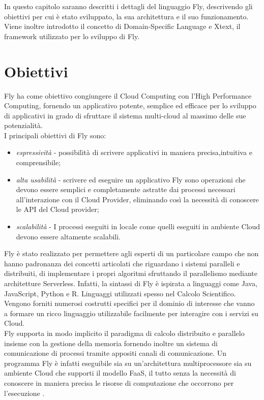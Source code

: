 In questo capitolo saranno descritti i dettagli del linguaggio Fly, descrivendo gli obiettivi per cui è stato sviluppato, la sua architettura e il suo funzionamento. Viene inoltre introdotto il concetto di Domain-Specific Language e Xtext, il framework utilizzato per lo sviluppo di Fly.

\section{Obiettivi}
Fly ha come obiettivo congiungere il Cloud Computing con l’High Performance Computing, fornendo un applicativo potente, semplice ed efficace per lo sviluppo di applicativi in grado di sfruttare il sistema multi-cloud al massimo delle sue potenzialità. \\
I principali obiettivi di Fly sono:

\begin{itemize}
    \item \textit{espressività} - possibilità di scrivere applicativi in maniera precisa,intuitiva e comprensibile;
    
    \item \textit{alta usabilità} - scrivere ed eseguire un applicativo Fly sono operazioni che devono essere semplici e completamente 
    astratte dai processi necessari all'interazione con il Cloud Provider, eliminando così la necessità di conoscere le API del Cloud provider;
    
    \item \textit{scalabilità} - I processi eseguiti in locale come quelli eseguiti in ambiente Cloud devono essere altamente scalabili.
\end{itemize}

Fly è stato realizzato per permettere agli esperti di un particolare campo che non hanno padronanza dei concetti articolati che riguardano i sistemi paralleli e distribuiti,
 di implementare i propri algoritmi sfruttando il parallelismo mediante architetture Serverless. Infatti, la sintassi di Fly è ispirata a linguaggi come Java, JavaScript, Python e R. 
 Linguaggi utilizzati spesso nel Calcolo Scientifico. Vengono forniti numerosi costrutti specifici per il dominio di interesse che vanno a formare un ricco linguaggio utilizzabile facilmente per interagire con i servizi su Cloud. \\
Fly supporta in modo implicito il paradigma di calcolo distribuito e parallelo insieme con la gestione della memoria fornendo inoltre un sistema di comunicazione di processi tramite appositi canali di comunicazione. Un programma Fly è infatti eseguibile sia su un'architettura multiprocessore sia su ambiente Cloud che supporti il modello FaaS, il tutto senza la necessità di conoscere in maniera precisa le risorse di computazione che occorrono per l'esecuzione \cite{ISISLab}.


